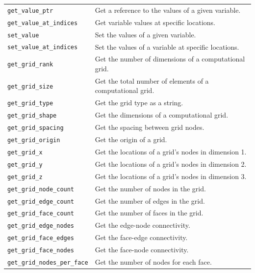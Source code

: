 \documentclass{article} %
\begin{document}
\begin{table}[htbp]
\begin{tabular}{ll}
        \verb|get_value_ptr| & Get a reference to the values of a given variable. \\
        \verb|get_value_at_indices| & Get variable values at specific locations. \\
        \verb|set_value| & Set the values of a given variable. \\
        \verb|set_value_at_indices| & Set the values of a variable at specific locations. \\
        \verb|get_grid_rank| & Get the number of dimensions of a computational grid. \\
        \verb|get_grid_size| & Get the total number of elements of a computational grid. \\
        \verb|get_grid_type| & Get the grid type as a string. \\
        \verb|get_grid_shape| & Get the dimensions of a computational grid. \\
        \verb|get_grid_spacing| & Get the spacing between grid nodes. \\
        \verb|get_grid_origin| & Get the origin of a grid. \\
        \verb|get_grid_x| & Get the locations of a grid’s nodes in dimension 1. \\
        \verb|get_grid_y| & Get the locations of a grid’s nodes in dimension 2. \\
        \verb|get_grid_z| & Get the locations of a grid’s nodes in dimension 3. \\
        \verb|get_grid_node_count| & Get the number of nodes in the grid. \\
        \verb|get_grid_edge_count| & Get the number of edges in the grid. \\
        \verb|get_grid_face_count| & Get the number of faces in the grid. \\
        \verb|get_grid_edge_nodes| & Get the edge-node connectivity. \\
        \verb|get_grid_face_edges| & Get the face-edge connectivity. \\
        \verb|get_grid_face_nodes| & Get the face-node connectivity. \\
        \verb|get_grid_nodes_per_face| & Get the number of nodes for each face. \\
    \hline
   \end{tabular}
   \label{tab:bmi}
\end{table}
\end{document}
